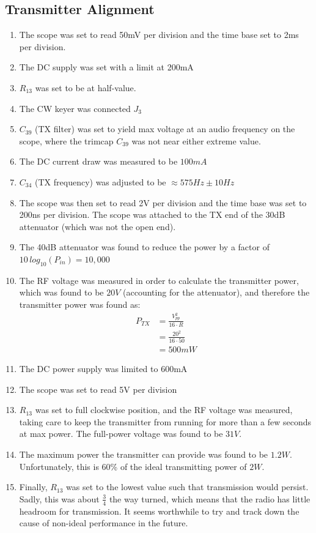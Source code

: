 \documentclass{./cls/hw}
\begin{document}
\subsection{Transmitter Alignment}
\begin{enumerate}
  \item The scope was set to read 50mV per division and the time base set to 2ms
    per division.
  \item The DC supply was set with a limit at 200mA
  \item $R_{13}$ was set to be at half-value.
  \item The CW keyer was connected $J_3$
  \item $C_{39}$ (TX filter) was set to yield max voltage at an audio frequency
    on the scope, where the trimcap $C_{39}$ was not near either extreme value.
  \item The DC current draw was measured to be $\boxed{100 mA}$
  \item $C_{34}$ (TX frequency) was adjusted to be $\approx575Hz\pm10Hz$
  \item The scope was then set to read 2V per division and the time base was
    set to 200ns per division. The scope was attached to the TX end of the 30dB
    attenuator (which was not the open end).
  \item The 40dB attenuator was found to reduce the power by a factor of
    $10\,log_{10}(P_{in})= \boxed{10,000}$
  \item The RF voltage was measured in order to calculate the transmitter
    power, which was found to be $20V$ (accounting for the attenuator), and therefore the transmitter power was
    found as:
    \begin{align*}
      P_{TX}&=\frac{V^2_{pp}}{16\cdot R}\\
      &=\frac{20^2}{16\cdot 50}\\
      &=\boxed{500 mW}
    \end{align*}
  \item The DC power supply was limited to 600mA
  \item The scope was set to read 5V per division
  \item $R_{13}$ was set to full clockwise position, and the RF voltage was
  measured, taking care to keep the transmitter from running for more than a
  few seconds at max power. The full-power voltage was found to be $\boxed{31 V}$.
  \item The maximum power the transmitter can provide was found to be $\boxed{
    1.2 W}$. Unfortunately, this is 60\% of the ideal transmitting power of
    $2W$.
  \item Finally, $R_{13}$ was set to the lowest value such that transmission
    would persist. Sadly, this was about $\frac{3}{4}$ the way turned, which
    means that the radio has little headroom for transmission. It seems
    worthwhile to try and track down the cause of non-ideal performance in the
    future.
\end{enumerate}
\end{document}
